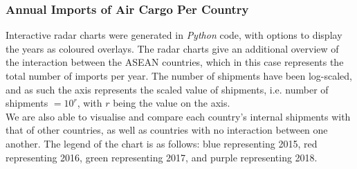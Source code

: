 \documentclass{article}
\begin{document}
\newpage

\subsubsection{Annual Imports of Air Cargo Per Country}

Interactive radar charts were generated in \textit{Python} code, with options to display the years as coloured overlays. The radar charts give an additional overview of the interaction between the ASEAN countries, which in this case represents the total number of imports per year. The number of shipments have been log-scaled, and as such the axis represents the scaled value of shipments, i.e. number of shipments $= 10^r$, with $r$ being the value on the axis. \\

\noindent We are also able to visualise and compare each country's internal shipments with that of other countries, as well as countries with no interaction between one another. The legend of the chart is as follows: blue representing 2015, red representing 2016, green representing 2017, and purple representing 2018. \\
\end{document}

